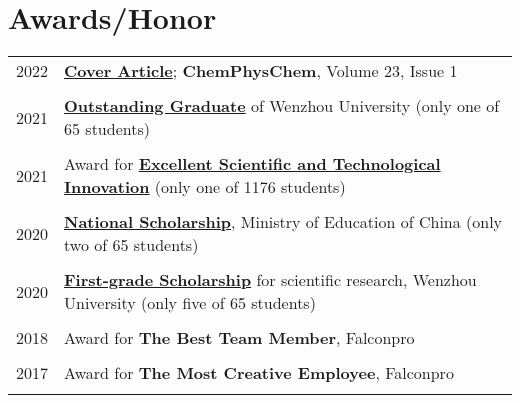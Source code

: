 \documentclass[a4paper,10pt]{article} %
\begin{document}
\section{Awards/Honor}
\begin{tabular}{r|l}	
2022                        & \href{https://chemistry-europe.onlinelibrary.wiley.com/doi/full/10.1002/cphc.202100867}{\textbf{Cover Article}}; \textbf{ChemPhysChem}, Volume 23, Issue 1\\
\multicolumn{2}{c}{} \\	%

2021                        & \href{https://nbviewer.org/github/HuangJiaLian/DataBase0/blob/9d45d2d591813a771e408be12a8b8f3a1b06cd44/uPic/2021_11_26_10_1.pdf}{\textbf{Outstanding Graduate}} of Wenzhou University (only one of 65 students)\\
\multicolumn{2}{c}{} \\	%

2021        				    & Award for \href{https://nbviewer.org/github/HuangJiaLian/DataBase0/blob/a069cea80af4ab070c9214480c666d4de1e5a054/uPic/2021_11_26_10_3.pdf}{\textbf{Excellent Scientific and Technological Innovation}} (only one of 1176 students)\\
\multicolumn{2}{c}{} \\	%

2020                        & \href{https://nbviewer.org/github/HuangJiaLian/DataBase0/blob/84275fe6b9b504ce06b182972187707c372b4123/uPic/2021_11_26_10_N.pdf}{\textbf{National Scholarship}}, Ministry of Education of China (only two of 65 students)\\   	
\multicolumn{2}{c}{} \\	%

2020                           & \href{https://nbviewer.org/github/HuangJiaLian/DataBase0/blob/ca47411a77d87d5af5ebc2c175a9b334642c6f48/uPic/2021_11_26_10_4.pdf}{\textbf{First-grade Scholarship}} for scientific research, Wenzhou University (only five of 65 students)\\
\multicolumn{2}{c}{} \\	%

2018                     & Award for \textbf{The Best Team Member}, Falconpro\\
\multicolumn{2}{c}{} \\	%

2017                     & Award for \textbf{The Most Creative Employee}, Falconpro \\
\multicolumn{2}{c}{} \\	%



\end{tabular}
\end{document}
